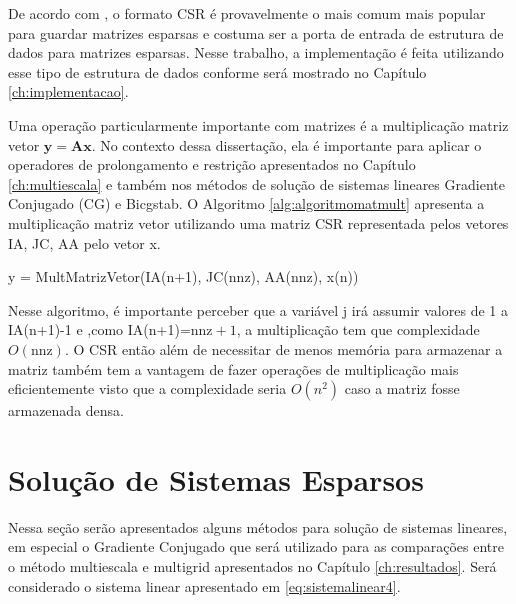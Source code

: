 De acordo com \citet{solverlinear}, o formato CSR é provavelmente o mais comum mais popular para guardar matrizes esparsas e costuma ser a porta de entrada de estrutura de dados para matrizes esparsas. Nesse trabalho, a implementação é feita utilizando esse tipo de estrutura de dados conforme será mostrado no Capítulo \ref{ch:implementacao}.

Uma operação particularmente importante com matrizes é a multiplicação matriz vetor $\mathbf{y} = \mathbf{A}\mathbf{x}$. No contexto dessa dissertação, ela é importante para aplicar o operadores de prolongamento e restrição apresentados no Capítulo \ref{ch:multiescala} e também nos métodos de solução de sistemas lineares Gradiente Conjugado (CG) e Bicgstab. O Algoritmo \ref{alg:algoritmomatmult} apresenta a multiplicação matriz vetor utilizando uma matriz CSR representada pelos vetores IA, JC, AA pelo vetor x.


\vspace{1cm}
\begin{algorithm}[H]
\caption{y = MultMatrizVetor(IA(n+1), JC(nnz), AA(nnz), x(n))}
\label{alg:algoritmomatmult}

\end{algorithm}
\vspace{1cm}


Nesse algoritmo, é importante perceber que a variável j irá assumir valores de 1 a IA(n+1)-1 e ,como IA(n+1)=$\text{nnz} + 1$, a multiplicação tem que complexidade $O(\text{nnz})$. O CSR então além de necessitar de menos memória para armazenar a matriz também tem a vantagem de fazer operações de multiplicação mais eficientemente visto que a complexidade seria $O(n^2)$ caso a matriz fosse armazenada densa.


\section{Solução de Sistemas Esparsos} \label{sec:cg}

Nessa seção serão apresentados alguns métodos para solução de sistemas lineares, em especial o Gradiente Conjugado que será utilizado para as comparações entre o método multiescala e multigrid apresentados no Capítulo \ref{ch:resultados}. Será considerado o sistema linear apresentado em \eqref{eq:sistemalinear4}.

